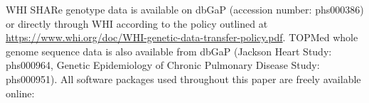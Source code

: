 \documentclass[12pt]{article}
\newcommand{\add}[1]{{\color{red}{[... #1 ...]}}}
\begin{document}

WHI SHARe genotype data is available on dbGaP (accession number: phs000386) or directly through WHI according to the policy outlined at \href{https://www.whi.org/doc/WHI-genetic-data-transfer-policy.pdf}{https://www.whi.org/doc/WHI-genetic-data-transfer-policy.pdf}. 
TOPMed whole genome sequence data is also available from dbGaP (Jackson Heart Study: phs000964, Genetic Epidemiology of Chronic Pulmonary Disease Study: phs000951). 
All software packages used throughout this paper are freely available online: 

\end{document}
